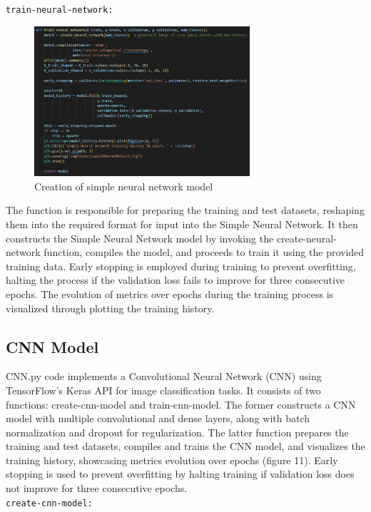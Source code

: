 \documentclass{article}
\newcommand{\code}[1]{\colorbox{light-gray}{\texttt{#1}}}
\begin{document}
\code{train-neural-network:}
\\\newline
\begin{figure}[H]
    \caption{Creation of simple neural network model}
    \centering
    \includegraphics[width=8cm]{../imgFolder/train_neural_network-code.png}
\end{figure}
The function is responsible for preparing the training and test datasets, reshaping them into the required format for input into the Simple Neural Network. It then constructs the Simple Neural Network model by invoking the create-neural-network function, compiles the model, and proceeds to train it using the provided training data. Early stopping is employed during training to prevent overfitting, halting the process if the validation loss fails to improve for three consecutive epochs. The evolution of metrics over epochs during the training process is visualized through plotting the training history.
\newpage

\subsection{CNN Model}
CNN.py code implements a Convolutional Neural Network (CNN) using TensorFlow's Keras API for image classification tasks. It consists of two functions: create-cnn-model and train-cnn-model. The former constructs a CNN model with multiple convolutional and dense layers, along with batch normalization and dropout for regularization. The latter function prepares the training and test datasets, compiles and trains the CNN model, and visualizes the training history, showcasing metrics evolution over epochs (figure 11). Early stopping is used to prevent overfitting by halting training if validation loss does not improve for three consecutive epochs.\\\newline
\code{create-cnn-model:}
\end{document}
